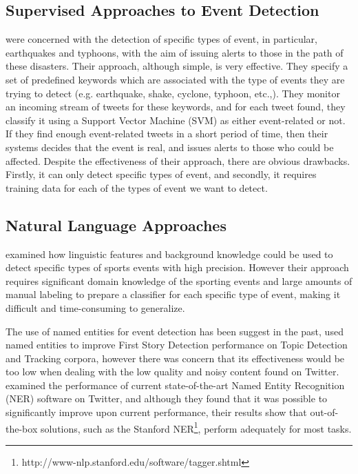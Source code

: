 \subsection{Supervised Approaches to Event Detection}
\cite{Sakaki:2010:EST:1772690.1772777} were concerned with the detection of specific types of event, in particular, earthquakes and typhoons, with the aim of issuing alerts to those in the path of these disasters. Their approach, although simple, is very effective. They specify a set of predefined keywords which are associated with the type of events they are trying to detect (e.g. earthquake, shake, cyclone, typhoon, etc.,). They monitor an incoming stream of tweets for these keywords, and for each tweet found, they classify it using a Support Vector Machine (SVM) as either event-related or not. If they find enough event-related tweets in a short period of time, then their systems decides that the event is real, and issues alerts to those who could be affected. Despite the effectiveness of their approach, there are obvious drawbacks. Firstly, it can only detect specific types of event, and secondly, it requires training data for each of the types of event we want to detect.

\subsection{Natural Language Approaches}
\cite{Choudhury11extractingsemantic} examined how linguistic features and  background knowledge could be used to detect specific types of sports events with high precision. However their approach requires significant domain knowledge of the sporting events and large amounts of manual labeling to prepare a classifier for each specific type of event, making it difficult and time-consuming to generalize.

The use of named entities for event detection has been suggest in the past,  \cite{Kumaran:2004:TCN:1008992.1009044} used named entities to improve First Story Detection performance on Topic Detection and Tracking corpora, however there was concern that its effectiveness would be too low when dealing with the low quality and noisy content found on Twitter. \cite{DBLP:conf/sigir/LiWHYDSL12} examined the performance of current state-of-the-art Named Entity Recognition (NER) software on Twitter, and although they found that it was possible to significantly improve upon current performance, their results show that out-of-the-box solutions, such as the Stanford NER\footnote{http://www-nlp.stanford.edu/software/tagger.shtml}, perform adequately for most tasks.

